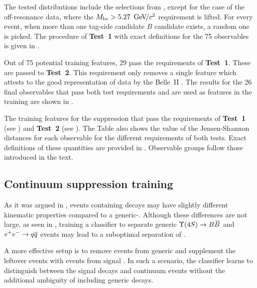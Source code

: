 The tested distributions include the selections from , except for the case of the off-resonance data, where the ${M_{\mathrm{bc}}}>5.27~{\mathrm{\,Ge\kern -0.1em V\!/}c^2}$ requirement is lifted.
For every event, when more than one tag-side candidate $B$ candidate exists, a random one is picked.
The procedure of \textbf{Test~1} with exact definitions for the 75 observables is given in .

Out of 75 potential training features, 29 pass the requirements of \textbf{Test~1}.
These are passed to \textbf{Test~2}.
This requirement only removes a single feature which attests to the good representation of data by the Belle~II \MC.
The results for the 26 final observables that pass both test requirements and are used as features in the \BDT training
are shown in .

\begin{table}[hbtp!]
    \centering
    \caption{\label{tab:passing_test1}The training features for the \epem\ra\qqbar suppression
    that pass the requirements of \textbf{Test~1} (see ) and \textbf{Test~2} (see ).
    The Table also shows the value of the Jensen-Shannon distances for each observable for the different requirements of both tests.
    Exact definitions of these quantities are provided in .
    Observable groups follow those introduced in the text.
    }   
    
\end{table}

\subsection{Continuum suppression training}\label{sec:continuum_training}

As it was argued in , events containing \BtoXsgamma decays may have slightly different kinematic properties compared to a generic-\BB.
Although these differences are not large, as seen in , training a classifier to separate generic \mbox{$\FourS\ra\BB$} and \mbox{$e^+e^-\rightarrow q\overline q$} events may lead to a suboptimal separation of \BtoXsgamma.

A more effective setup is to remove \BB events from generic \MC and supplement the leftover events with \BtoXsgamma events from signal \MC. 
In such a scenario, the classifier learns to distinguish between the signal decays and continuum events without the additional ambiguity of including generic \BB decays.


